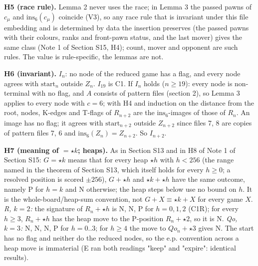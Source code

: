 \textbf{H5 (race rule).} Lemma 2 never uses the race; in Lemma 3 the passed pawns of $c_\mu$ and $\mathrm{ins}_6(c_\mu)$ coincide (V3), so any race rule that is invariant under this file embedding and is determined by data the insertion preserves (the passed pawns with their colours, ranks and front-pawn status, and the last mover) gives the same class (Note 1 of Section S15, H4); count, mover and opponent are such rules. The value is rule-specific, the lemmas are not.

\textbf{H6 (invariant).} $I_n$: no node of the reduced game has a flag, and every node agrees with $\mathrm{start}_n$ outside $Z_n$. $I_{19}$ is C1. If $I_n$ holds ($n\ge19$): every node is non-terminal with no flag, and $A$ consists of pattern files (section 2), so Lemma 3 applies to every node with $c=6$; with H4 and induction on the distance from the root, nodes, K-edges and T-flags of $R_{n+2}$ are the $\mathrm{ins}_6$-images of those of $R_n$. An image has no flag; it agrees with $\mathrm{start}_{n+2}$ outside $Z_{n+2}$ since files 7, 8 are copies of pattern files 7, 6 and $\mathrm{ins}_6(Z_n)=Z_{n+2}$. So $I_{n+2}$.

\textbf{H7 (meaning of $=\star k$; heaps).} As in Section S13 and in H8 of Note 1 of Section S15: $G=\star k$ means that for every heap $\star h$ with $h<256$ (the range named in the theorem of Section S13, which itself holds for every $h\ge0$; a resolved position is scored $\pm256$), $G+\star h$ and $\star k+\star h$ have the same outcome, namely P for $h=k$ and N otherwise; the heap steps below use no bound on $h$. It is the whole-board/heap-sum convention, not $G+X\equiv\star k+X$ for every game $X$. \emph{R, $k=2$:} the signature of $R_n+\star h$ is N, N, P for $h=0,1,2$ (C1R); for every $h\ge3$, $R_n+\star h$ has the heap move to the P-position $R_n+\star2$, so it is N. \emph{Qo, $k=3$:} N, N, N, P for $h=0..3$; for $h\ge4$ the move to $Qo_n+\star3$ gives N. The start has no flag and neither do the reduced nodes, so the e.p. convention across a heap move is immaterial (E ran both readings "keep" and "expire": identical results).

